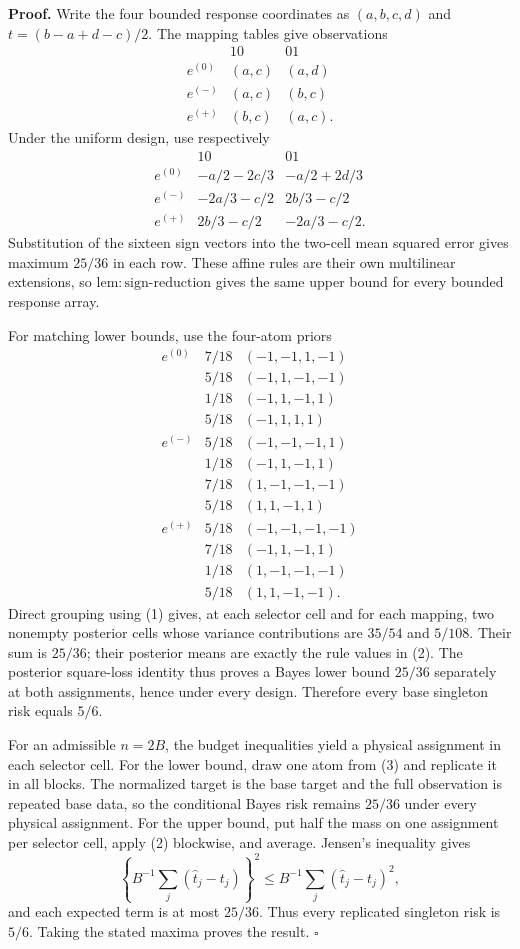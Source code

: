 \textbf{Proof.}
Write the four bounded response coordinates as \((a,b,c,d)\) and \(t=(b-a+d-c)/2\). The mapping tables give observations
\[
\begin{array}{c|cc}
&10&01\\ \hline
e^{(0)}&(a,c)&(a,d)\\
e^{(-)}&(a,c)&(b,c)\\
e^{(+)}&(b,c)&(a,c).
\end{array} \tag{1}
\]
Under the uniform design, use respectively
\[
\begin{array}{c|cc}
&10&01\\ \hline
e^{(0)}&-a/2-2c/3&-a/2+2d/3\\
e^{(-)}&-2a/3-c/2&2b/3-c/2\\
e^{(+)}&2b/3-c/2&-2a/3-c/2.
\end{array} \tag{2}
\]
Substitution of the sixteen sign vectors into the two-cell mean squared error gives maximum \(25/36\) in each row. These affine rules are their own multilinear extensions, so \(\mathrm{lem{:}sign\text{-}reduction}\) gives the same upper bound for every bounded response array.

For matching lower bounds, use the four-atom priors
\[
\begin{array}{c|c|c}
e^{(0)}&7/18&(-1,-1,1,-1)\\
&5/18&(-1,1,-1,-1)\\
&1/18&(-1,1,-1,1)\\
&5/18&(-1,1,1,1)\\ \hline
e^{(-)}&5/18&(-1,-1,-1,1)\\
&1/18&(-1,1,-1,1)\\
&7/18&(1,-1,-1,-1)\\
&5/18&(1,1,-1,1)\\ \hline
e^{(+)}&5/18&(-1,-1,-1,-1)\\
&7/18&(-1,1,-1,1)\\
&1/18&(1,-1,-1,-1)\\
&5/18&(1,1,-1,-1).
\end{array} \tag{3}
\]
Direct grouping using (1) gives, at each selector cell and for each mapping, two nonempty posterior cells whose variance contributions are \(35/54\) and \(5/108\). Their sum is \(25/36\); their posterior means are exactly the rule values in (2). The posterior square-loss identity thus proves a Bayes lower bound \(25/36\) separately at both assignments, hence under every design. Therefore every base singleton risk equals \(5/6\).

For an admissible \(n=2B\), the budget inequalities yield a physical assignment in each selector cell. For the lower bound, draw one atom from (3) and replicate it in all blocks. The normalized target is the base target and the full observation is repeated base data, so the conditional Bayes risk remains \(25/36\) under every physical assignment. For the upper bound, put half the mass on one assignment per selector cell, apply (2) blockwise, and average. Jensen's inequality gives
\[
 \left\{B^{-1}\sum_j(\widehat t_j-t_j)\right\}^2
 \le B^{-1}\sum_j(\widehat t_j-t_j)^2,
\]
and each expected term is at most \(25/36\). Thus every replicated singleton risk is \(5/6\). Taking the stated maxima proves the result. \(\square\)